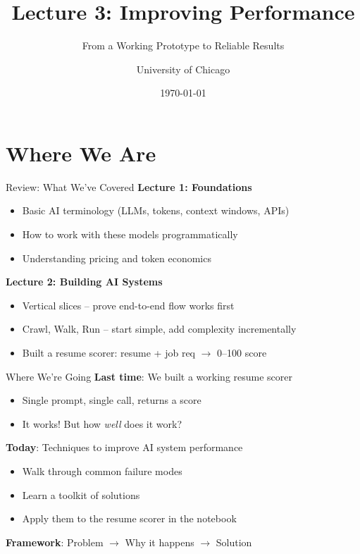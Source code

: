 \documentclass[aspectratio=169]{beamer}
\title{Lecture 3: Improving Performance}
\subtitle{From a Working Prototype to Reliable Results}
\author{University of Chicago}
\date{\today}
\begin{document}
\frame{\titlepage}

\section{Where We Are}

\begin{frame}{Review: What We've Covered}
\textbf{Lecture 1: Foundations}
\begin{itemize}
    \item Basic AI terminology (LLMs, tokens, context windows, APIs)
    \item How to work with these models programmatically
    \item Understanding pricing and token economics
\end{itemize}
\vspace{0.3cm}

\textbf{Lecture 2: Building AI Systems}
\begin{itemize}
    \item Vertical slices -- prove end-to-end flow works first
    \item Crawl, Walk, Run -- start simple, add complexity incrementally
    \item Built a resume scorer: resume + job req $\rightarrow$ 0--100 score
\end{itemize}
\end{frame}

\begin{frame}{Where We're Going}
\textbf{Last time}: We built a working resume scorer
\begin{itemize}
    \item Single prompt, single call, returns a score
    \item It works! But how \textit{well} does it work?
\end{itemize}
\vspace{0.3cm}

\textbf{Today}: Techniques to improve AI system performance
\begin{itemize}
    \item Walk through common failure modes
    \item Learn a toolkit of solutions
    \item Apply them to the resume scorer in the notebook
\end{itemize}
\vspace{0.3cm}

\textbf{Framework}: Problem $\rightarrow$ Why it happens $\rightarrow$ Solution
\end{frame}
\end{document}
